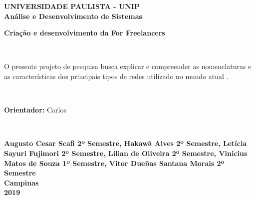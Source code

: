 \thispagestyle{empty}
\begin{center}
\normalsize{\textbf{UNIVERSIDADE PAULISTA - UNIP}}\\[0.3pc]
\normalsize{\textbf{Análise e Desenvolvimento de Sistemas}}\\[8pc]
\parbox{10cm}{\begin{center}\normalsize{\textbf{Criação e desenvolvimento da For Freelancers}}\end{center}}\\
\end{center}
\par
\vspace{30pt}
\hspace*{130pt}\parbox{10cm}{{\normalsize O presente projeto de pesquisa busca explicar e compreender as nomenclaturas e as características dos principais tipos de redes utilizado no mundo atual .}}\\[1pc]

\noindent\hspace*{165pt}\parbox{10cm}{{\normalsize \textbf{Orientador:} Carlos}}\\[1pc]
\begin{center}
\vspace{50pt}
\normalsize{\textbf{Augusto Cesar Scafi 2º Semestre, Hakawã Alves 2º Semestre, Letícia Sayuri Fujimori 2º Semestre, Lilian de Oliveira 2º Semestre, Vinicius Matos de Souza 1º Semestre, Vitor Dueñas Santana Morais 2º Semestre}}\\[1pc]%
\vfill
\normalsize{\textbf{Campinas}}\\[1pc]
\normalsize{\textbf{2019}}
\end{center}
\newpage 